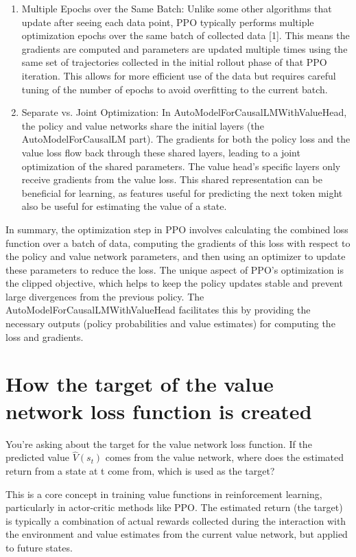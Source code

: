 \documentclass[10pt,a4paper]{report}
\begin{document}
\begin{enumerate}
\item    Multiple Epochs over the Same Batch: Unlike some other algorithms that update after seeing each data point, PPO typically performs multiple optimization epochs over the same batch of collected data [1]. This means the gradients are computed and parameters are updated multiple times using the same set of trajectories collected in the initial rollout phase of that PPO iteration. This allows for more efficient use of the data but requires careful tuning of the number of epochs to avoid overfitting to the current batch.

\item    Separate vs. Joint Optimization: In AutoModelForCausalLMWithValueHead, the policy and value networks share the initial layers (the AutoModelForCausalLM part). The gradients for both the policy loss and the value loss flow back through these shared layers, leading to a joint optimization of the shared parameters. The value head's specific layers only receive gradients from the value loss. This shared representation can be beneficial for learning, as features useful for predicting the next token might also be useful for estimating the value of a state.
\end{enumerate}

In summary, the optimization step in PPO involves calculating the combined loss function over a batch of data, computing the gradients of this loss with respect to the policy and value network parameters, and then using an optimizer to update these parameters to reduce the loss. The unique aspect of PPO's optimization is the clipped objective, which helps to keep the policy updates stable and prevent large divergences from the previous policy. The AutoModelForCausalLMWithValueHead facilitates this by providing the necessary outputs (policy probabilities and value estimates) for computing the loss and gradients.


\section{How the target of the value network loss function is created}

You're asking about the target for the value network loss function. If the predicted value $\hat{V}(s_t)$ comes from the value network, where does the estimated return from a state at t come from, which is used as the target?

This is a core concept in training value functions in reinforcement learning, particularly in actor-critic methods like PPO. The estimated return (the target) is typically a combination of actual rewards collected during the interaction with the environment and value estimates from the current value network, but applied to future states.
\end{document}
